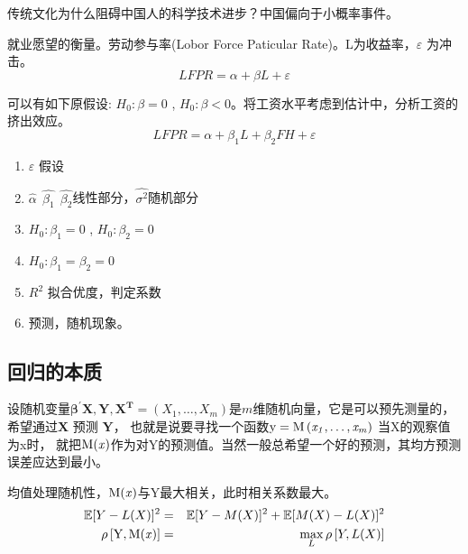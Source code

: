 \begin{myexample}
	传统文化为什么阻碍中国人的科学技术进步？中国偏向于小概率事件。
\end{myexample}
\begin{myexample}
	就业愿望的衡量。劳动参与率(Lobor Force Paticular Rate)。L为收益率，$ \varepsilon $ 为冲击。
	$$ LFPR = \alpha + \beta L + \varepsilon $$
\end{myexample}

可以有如下原假设: $ H_0 : \beta = 0 $ , $ H_0 : \beta < 0 $。将工资水平考虑到估计中，分析工资的挤出效应。
$$ LFPR = \alpha + \beta_1 L + \beta_2 FH + \varepsilon $$

{}
\begin{enumerate}[1)]
	\item $\varepsilon$ 假设
	\item $\hat{\alpha} \ \ \hat{\beta_1} \ \ \hat{\beta_2} $线性部分，$ \hat{\sigma^2} $随机部分
	\item $ H_0 : \beta_1 = 0 $ , $ H_0 : \beta_2 = 0 $
	\item $ H_0 : \beta_1 = \beta_2 =  0 $
	\item $ R^2 $ 拟合优度，判定系数
	\item 预测，随机现象。
\end{enumerate}

\subsection{回归的本质}

设随机变量$ \boldsymbol{\beta^{\prime} X, Y, X^{T}} =\left(X_{1}, \ldots, X_{m} \right) $是$ m $维随机向量，它是可以预先测量的，
希望通过$ \boldsymbol{X} $ 预测 $ \boldsymbol{Y} $， 也就是说要寻找一个函数$ \rm y= M \left(\it x_{1}, \ldots, \it x_{m}\right) $ 当X的观察值为x时，
就把$ \rm M(\it x) $作为对Y的预测值。当然一般总希望一个好的预测，其均方预测误差应达到最小。

均值处理随机性，$ \rm M(\it x) $与Y最大相关，此时相关系数最大。
\begin{eqnarray}
	\mathbb{E}[Y-L(X)]^{2} & = & \mathbb{E}[Y-M(X)]^{2} + \mathbb{E}[M(X)-L(X)]^{2}  \notag \\ 
	\rm \rho\left [ Y,M({\it x}) \right ] & = & \max_{L}\rho\left [ Y,L(X) \right ] \notag
\end{eqnarray}

